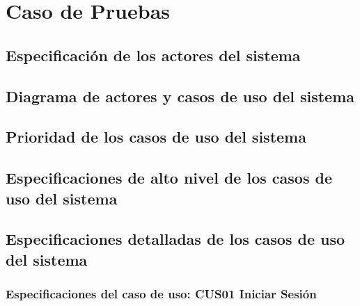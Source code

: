 \chapter{Caso de Pruebas}

\section{Especificación de los actores del sistema}

\section{Diagrama de actores y casos de uso del sistema}

\section{Prioridad de los casos de uso del sistema}

\section{Especificaciones de alto nivel de los casos de uso del sistema}

\section{Especificaciones detalladas de los casos de uso del sistema}

\subsection{Especificaciones del caso de uso: CUS01 Iniciar Sesión}
